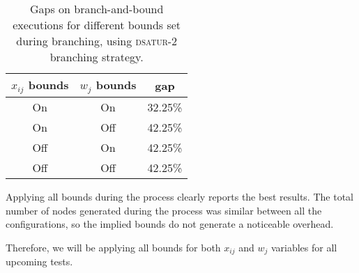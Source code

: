 \begin{table}[h]
\centering

\begin{tabular}{|c|c|c|}
\hline
$x_{ij}$ bounds & $w_j$ bounds & gap \\
\hline
On & On & 32.25\% \\
On & Off & 42.25\% \\
Off & On & 42.25\% \\
Off & Off & 42.25\% \\
\hline
\end{tabular}

\caption{Gaps on branch-and-bound executions for different bounds set during branching, using \textsc{dsatur-2} branching strategy.}
\label{table:branch:bounds}

\end{table}	

Applying all bounds during the process clearly reports the best results. The total number of nodes generated during the process was similar between all the configurations, so the implied bounds do not generate a noticeable overhead. 

Therefore, we will be applying all bounds for both $x_{ij}$ and $w_j$ variables for all upcoming tests.
